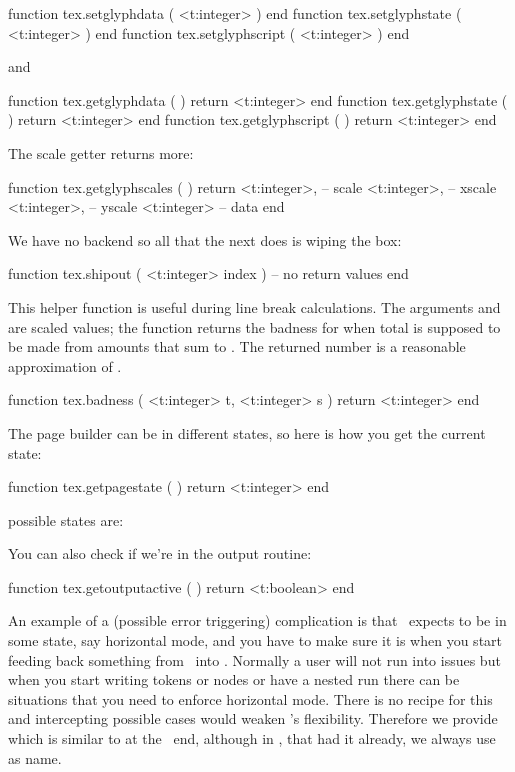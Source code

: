 \starttyping[option=LUA]
function tex.setglyphdata   ( <t:integer> ) end
function tex.setglyphstate  ( <t:integer> ) end
function tex.setglyphscript ( <t:integer> ) end
\stoptyping

and

\starttyping[option=LUA]
function tex.getglyphdata   ( ) return <t:integer> end
function tex.getglyphstate  ( ) return <t:integer> end
function tex.getglyphscript ( ) return <t:integer> end
\stoptyping

The scale getter returns more:

\starttyping[option=LUA]
function tex.getglyphscales ( )
    return
        <t:integer>, -- scale
        <t:integer>, -- xscale
        <t:integer>, -- yscale
        <t:integer>  -- data
end
\stoptyping

\stopsubsection

\startsubsection [title={Whatever}]

We have no backend so all that the next does is wiping the box:

\starttyping[option=LUA]
function tex.shipout ( <t:integer> index )
    -- no return values
end
\stoptyping

This helper function is useful during line break calculations. The arguments
 and  are scaled values; the function returns the badness for
when total  is supposed to be made from amounts that sum to .
The returned number is a reasonable approximation of .

\starttyping[option=LUA]
function tex.badness (
    <t:integer> t,
    <t:integer> s
)
    return <t:integer>
end
\stoptyping

The page builder can be in different states, so here is how you get the current state:

\starttyping[option=LUA]
function tex.getpagestate ( )
    return <t:integer>
end
\stoptyping

possible states are:

\startcolumns[n=2]
\stopcolumns

You can also check if we're in the output routine:

\starttyping[option=LUA]
function tex.getoutputactive ( )
    return <t:boolean>
end
\stoptyping

An example of a (possible error triggering) complication is that \TEX\ expects to
be in some state, say horizontal mode, and you have to make sure it is when you
start feeding back something from \LUA\ into \TEX. Normally a user will not run
into issues but when you start writing tokens or nodes or have a nested run there
can be situations that you need to enforce horizontal mode. There is no recipe
for this and intercepting possible cases would weaken \LUATEX's flexibility.
Therefore we provide  which is similar to \type {\quitvmode} at
the \TEX\ end, although in \CONTEXT, that had it already, we always use \type
{\dontleavehmode} as name.


